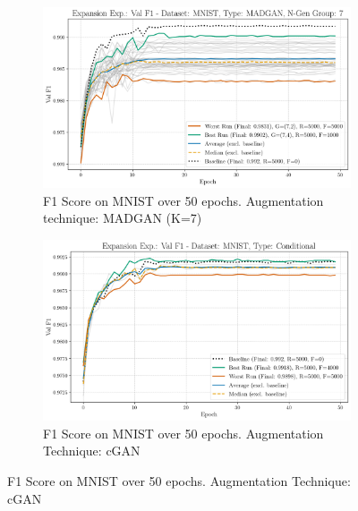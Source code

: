 \begin{figure}[H]
	\centering
	\begin{subfigure}{.85\textwidth}
		\includegraphics[width=\textwidth]{abb/strat_classifier_performance/MNIST_STRATIFIED_CLASSIFIERS_MADGAN_NEW/expansion_experiments/val_f1_score_MADGAN_MNIST_n_gen_7_all.png}
		\caption{F1 Score on MNIST over 50 epochs. Augmentation technique: MADGAN (K=7)}
        \label{fig:res_expansion_mnist_ccgan_vs_madgan__madgan}
	\end{subfigure}
	\begin{subfigure}{.85\textwidth}
		\includegraphics[width=\textwidth]{abb/strat_classifier_performance/MNIST_STRATIFIED_CLASSIFIERS_COND_GAN/expansion_experiments/val_f1_score_['COND']_MNIST_all.png}
		\caption{F1 Score on MNIST over 50 epochs. Augmentation Technique: cGAN}
        \label{fig:res_expansion_mnist_ccgan_vs_madgan__cgan}
	\end{subfigure}
\end{figure}

